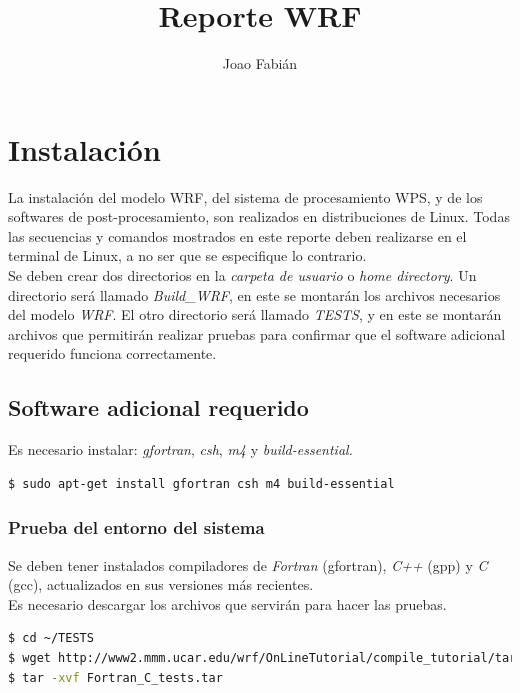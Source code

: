 \documentclass[12pt,letter]{article}
\begin{document}
\title{Reporte WRF}
\author{Joao Fabi\'an}
\date{ }
\maketitle 
\vspace{0.009cm}

\section*{Instalaci\'on}
La instalaci\'on del modelo WRF, del sistema de procesamiento WPS, y de los softwares de post-procesamiento, son realizados en distribuciones de Linux. Todas las secuencias y comandos mostrados en este reporte deben realizarse en el terminal de Linux, a no ser que se especifique lo contrario.\\

\noindent Se deben crear dos directorios en la \textit{carpeta de usuario} o \textit{home directory}. Un directorio ser\'a llamado \textit{Build\_WRF}, en este se montar\'an los archivos necesarios del modelo \textit{WRF}. El otro directorio ser\'a llamado \textit{TESTS}, y en este se montar\'an archivos que permitir\'an realizar pruebas para confirmar que el software adicional requerido funciona correctamente.

\subsection*{Software adicional requerido}
Es necesario instalar: \textit{gfortran}, \textit{csh}, \textit{m4} y  \textit{build-essential.} 
\begin{lstlisting}[language=bash]
$ sudo apt-get install gfortran csh m4 build-essential
\end{lstlisting}
					
\subsubsection*{Prueba del entorno del sistema}
Se deben tener instalados compiladores de \textit{Fortran} (gfortran), \textit{C++} (gpp) y \textit{C} (gcc), actualizados en sus versiones m\'as recientes.\\

\noindent Es necesario descargar los archivos que servir\'an para hacer las pruebas.
\begin{lstlisting}[language=bash]
$ cd ~/TESTS
$ wget http://www2.mmm.ucar.edu/wrf/OnLineTutorial/compile_tutorial/tar_files/Fortran_C_tests.tar
$ tar -xvf Fortran_C_tests.tar
\end{lstlisting}
\end{document}
